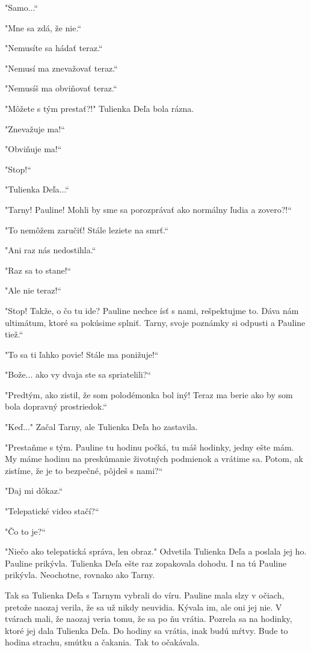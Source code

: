 \documentclass{book}
\begin{document}
"$ $Samo...“

"$ $Mne sa zdá, že nie.“

"$ $Nemusíte sa hádať teraz.“

"$ $Nemusí ma znevažovať teraz.“

"$ $Nemusíš ma obviňovať teraz.“

"$ $Môžete s tým prestať?!"$ $ Tulienka Deľa bola rázna.

"$ $Znevažuje ma!“

"$ $Obviňuje ma!“

"$ $Stop!“

"$ $Tulienka Deľa...“

"$ $Tarny! Pauline! Mohli by sme sa porozprávať ako normálny ľudia a zovero?!“

"$ $To nemôžem zaručiť! Stále leziete na smrť.“

"$ $Ani raz nás nedostihla.“

"$ $Raz sa to stane!“

"$ $Ale nie teraz!“

"$ $Stop! Takže, o čo tu ide? Pauline nechce ísť s nami, rešpektujme to. Dáva nám ultimátum, ktoré sa pokúsime splniť. Tarny, svoje poznámky si odpusti a Pauline tiež.“

"$ $To sa ti ľahko povie! Stále ma ponižuje!“

"$ $Bože... ako vy dvaja ste sa spriatelili?“

"$ $Predtým, ako zistil, že som polodémonka bol iný! Teraz ma berie ako by som bola dopravný prostriedok.“

"$ $Keď..."$ $ Začal Tarny, ale Tulienka Deľa ho zastavila.

"$ $Prestaňme s tým. Pauline tu hodinu počká, tu máš hodinky, jedny ešte mám. My máme hodinu na preskúmanie životných podmienok a vrátime sa. Potom, ak zistíme, že je to bezpečné, pôjdeš s nami?“

"$ $Daj mi dôkaz.“

"$ $Telepatické video stačí?“

"$ $Čo to je?“

"$ $Niečo ako telepatická správa, len obraz."$ $ Odvetila Tulienka Deľa a poslala jej ho. Pauline prikývla. Tulienka Deľa ešte raz zopakovala dohodu. I na tú Pauline prikývla. Neochotne, rovnako ako Tarny.

Tak sa Tulienka Deľa s Tarnym vybrali do víru. Pauline mala slzy v očiach, pretože naozaj verila, že sa už nikdy neuvidia. Kývala im, ale oni jej nie. V tvárach mali, že naozaj veria tomu, že sa po ňu vrátia. Pozrela sa na hodinky, ktoré jej dala Tulienka Deľa. Do hodiny sa vrátia, inak budú mŕtvy. Bude to hodina strachu, smútku a čakania. Tak to očakávala.
\end{document}
